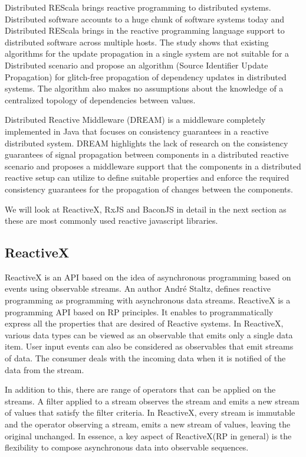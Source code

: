 Distributed REScala\cite{Drechsler:2014:DRU:2660193.2660240} brings reactive programming to distributed systems. Distributed software accounts to a huge chunk of software systems today and Distributed REScala brings in the reactive programming language support to distributed software across multiple hosts. The study\cite{Drechsler:2014:DRU:2660193.2660240} shows that existing algorithms for the update propagation in a single system are not suitable for a Distributed scenario and propose an algorithm (Source Identifier Update Propagation) for glitch-free propagation of dependency updates in distributed systems. The algorithm also makes no assumptions about the knowledge of a centralized topology of dependencies between values.

Distributed Reactive Middleware (DREAM) \cite{Margara:2014:WDD:2611286.2611290} is a middleware completely implemented in Java that focuses on consistency guarantees in a reactive distributed system. DREAM highlights the lack of research on the consistency guarantees of signal propagation between components in a distributed reactive scenario and proposes a middleware support that the components in a distributed reactive setup can utilize to define suitable properties and enforce the required consistency guarantees for the propagation of changes between the components.

We will look at ReactiveX, RxJS and BaconJS in detail in the next section as these are most commonly used reactive javascript libraries.

\subsection{ReactiveX}
ReactiveX is an API based on the idea of asynchronous programming based on events using observable streams. An author André Staltz, defines reactive programming as programming with asynchronous data streams\cite{introToRP}. ReactiveX is a programming API based on RP principles. It enables to programmatically express \cite{Doblander:2015:GEA:2675743.2776757} all the properties that are desired of Reactive systems\cite{reactiveManifesto}. In ReactiveX, various data types can be viewed as an observable that emits only a single data item. User input events can also be considered as observables that emit streams of data. The consumer deals with the incoming data when it is notified of the data from the stream.

In addition to this, there are range of operators that can be applied on the streams. A filter applied to a stream observes the stream and emits a new stream of values that satisfy the filter criteria. In ReactiveX, every stream is immutable and the operator observing a stream, emits a new stream of values, leaving the original unchanged. In essence, a key aspect of ReactiveX(RP in general) is the flexibility to compose \cite{Meyerovich:2009:FPL:1639949.1640091} asynchronous data into observable sequences.

